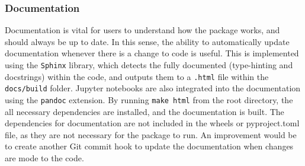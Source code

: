\subsubsection{Documentation}
Documentation is vital for users to understand how the package works, and should always be up to date.
In this sense, the ability to automatically update documentation whenever there is a change to code is useful. 
This is implemented using the \texttt{Sphinx} library, which detects the fully documented (type-hinting and docstrings)
within the code, and outputs them to a \texttt{.html} file within the \texttt{docs/build} folder.  
Jupyter notebooks are also integrated into the documentation using the \texttt{pandoc} extension. 
By running \texttt{make html} from the root directory, the all necessary dependencies are installed, 
and the documentation is built.
The dependencies for documentation are not included in the wheels or pyproject.toml file, 
as they are not necessary for the package to run.
An improvement would be to create another Git commit hook to update the documentation when changes are mode to the code. 

